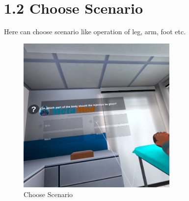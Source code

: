 \section{1.2 Choose Scenario}
Here can choose scenario like operation of leg, arm, foot etc.
\begin{figure}[h]
	\centering
	\includegraphics[width=0.7\textwidth, height=0.3\textheight]{Images/select body part.png}
	\caption{Choose Scenario}
	\label{fig:ChooseScenario}
\end{figure}